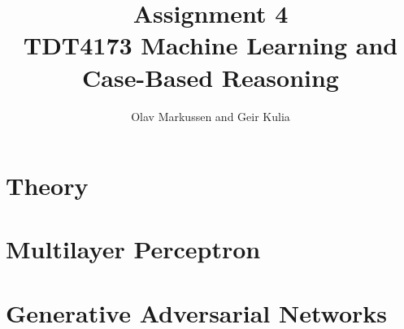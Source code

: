 \documentclass{article}
\begin{document}
\title{\huge Assignment 4 \\ \small{TDT4173 Machine Learning and Case-Based Reasoning}}

\author{Olav Markussen and Geir Kulia}

\maketitle

\section{Theory}
	\label{sec:theory}
	

\section{Multilayer Perceptron}
	\label{sec:mlp}
	

\section{Generative Adversarial Networks}
	\label{sec:wgan}
	

{}

\end{document}
